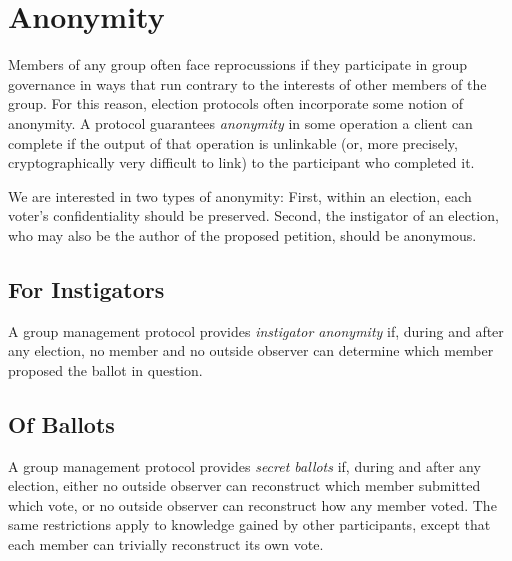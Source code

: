 \section{Anonymity}
Members of any group often face reprocussions if they participate in group
governance in ways that run contrary to the interests of other members of
the group. For this reason, election protocols often incorporate some notion
of anonymity. A protocol guarantees \emph{anonymity} in some operation a
client can complete if the output of that operation is unlinkable (or, more
precisely, cryptographically very difficult to link) to the participant who
completed it\cite{ford_hiding_2014}.

We are interested in two types of anonymity: First, within an election,
each voter's confidentiality should be preserved. Second, the instigator of an
election, who may also be the author of the proposed petition, should be
anonymous.

  \subsection{For Instigators}
  A group management protocol provides \emph{instigator anonymity} if, during
  and after any election, no member and no outside observer can determine
  which member proposed the ballot in question.

  \subsection{Of Ballots}
  A group management protocol provides \emph{secret ballots} if, during and
  after any election, either no outside observer can reconstruct which member
  submitted which vote, or no outside observer can reconstruct how any
  member voted. The same restrictions apply to knowledge gained by other
  participants, except that each member can trivially reconstruct its own vote.

